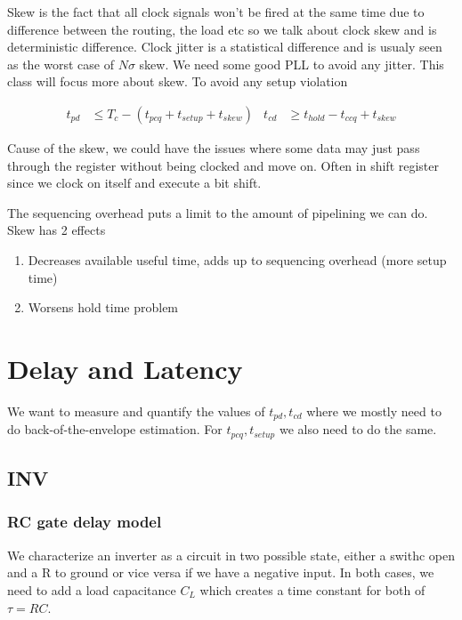 \documentclass{report}
\begin{document}
Skew is the fact that all clock signals won't be fired at the same time due to difference between the routing, the load etc so we talk about clock skew and is deterministic difference. Clock jitter is a statistical difference and is usualy seen as the worst case of $N \sigma $ skew. We need some good PLL to avoid any jitter. This class will focus more about skew. To avoid any setup violation

\begin{align}
    t_{pd} &\leqslant T_c - (t_{pcq} + t_{setup} + t_{skew}) & t_{cd} &\geqslant t_{hold} - t_{ccq} + t_{skew}
\end{align}

Cause of the skew, we could have the issues where some data may just pass through the register without being clocked and move on. Often in shift register since we clock on itself and execute a bit shift.

The sequencing overhead puts a limit to the amount of pipelining we can do. Skew has 2 effects

\begin{enumerate}
    \item Decreases available useful time, adds up to sequencing overhead (more setup time)
    \item Worsens hold time problem
\end{enumerate}

\section{Delay and Latency}

We want to measure and quantify the values of $t_{pd},t_{cd}$ where we mostly need to do back-of-the-envelope estimation. For $t_{pcq},t_{setup}$ we also need to do the same.

\subsection{INV}

\subsubsection{RC gate delay model}

We characterize an inverter as a circuit in two possible state, either a swithc open and a R to ground or vice versa if we have a negative input. In both cases, we need to add a load capacitance $C_L$ which creates a time constant for both of $\tau = RC$.
\end{document}
